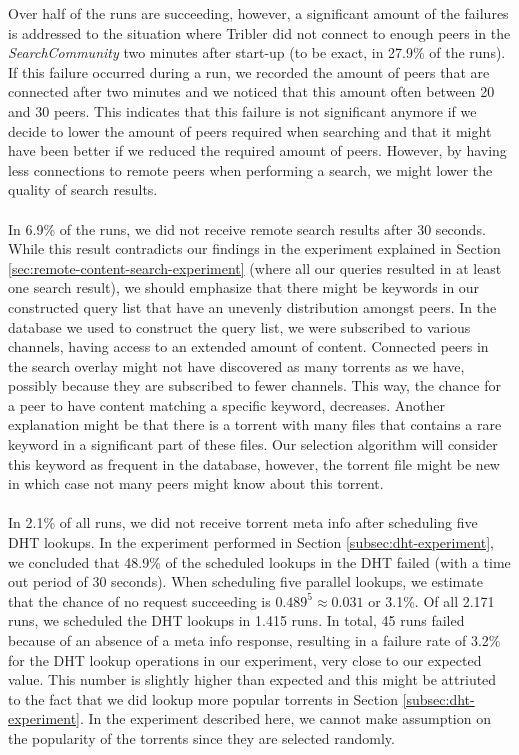 Over half of the runs are succeeding, however, a significant amount of the failures is addressed to the situation where Tribler did not connect to enough peers in the \emph{SearchCommunity} two minutes after start-up (to be exact, in 27.9\% of the runs). If this failure occurred during a run, we recorded the amount of peers that are connected after two minutes and we noticed that this amount often between 20 and 30 peers. This indicates that this failure is not significant anymore if we decide to lower the amount of peers required when searching and that it might have been better if we reduced the required amount of peers. However, by having less connections to remote peers when performing a search, we might lower the quality of search results.\\\\
In 6.9\% of the runs, we did not receive remote search results after 30 seconds. While this result contradicts our findings in the experiment explained in Section \ref{sec:remote-content-search-experiment} (where all our queries resulted in at least one search result), we should emphasize that there might be keywords in our constructed query list that have an unevenly distribution amongst peers. In the database we used to construct the query list, we were subscribed to various channels, having access to an extended amount of content. Connected peers in the search overlay might not have discovered as many torrents as we have, possibly because they are subscribed to fewer channels. This way, the chance for a peer to have content matching a specific keyword, decreases. Another explanation might be that there is a torrent with many files that contains a rare keyword in a significant part of these files. Our selection algorithm will consider this keyword as frequent in the database, however, the torrent file might be new in which case not many peers might know about this torrent.\\\\
In 2.1\% of all runs, we did not receive torrent meta info after scheduling five DHT lookups. In the experiment performed in Section \ref{subsec:dht-experiment}, we concluded that 48.9\% of the scheduled lookups in the DHT failed (with a time out period of 30 seconds). When scheduling five parallel lookups, we estimate that the chance of no request succeeding is $ 0.489^5 \approx 0.031 $ or 3.1\%. Of all 2.171 runs, we scheduled the DHT lookups in 1.415 runs. In total, 45 runs failed because of an absence of a meta info response, resulting in a failure rate of 3.2\% for the DHT lookup operations in our experiment, very close to our expected value. This number is slightly higher than expected and this might be attriuted to the fact that we did lookup more popular torrents in Section \ref{subsec:dht-experiment}. In the experiment described here, we cannot make assumption on the popularity of the torrents since they are selected randomly.\\\\
